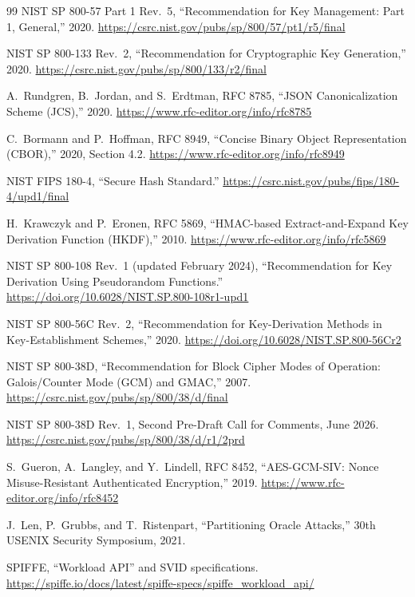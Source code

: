 \documentclass[11pt,letterpaper]{article}
\begin{document}
\begin{thebibliography}{99}
 NIST SP 800-57 Part 1 Rev.~5, ``Recommendation for Key Management: Part 1, General,'' 2020. \url{https://csrc.nist.gov/pubs/sp/800/57/pt1/r5/final}

 NIST SP 800-133 Rev.~2, ``Recommendation for Cryptographic Key Generation,'' 2020. \url{https://csrc.nist.gov/pubs/sp/800/133/r2/final}

 A.~Rundgren, B.~Jordan, and S.~Erdtman, RFC 8785, ``JSON Canonicalization Scheme (JCS),'' 2020. \url{https://www.rfc-editor.org/info/rfc8785}

 C.~Bormann and P.~Hoffman, RFC 8949, ``Concise Binary Object Representation (CBOR),'' 2020, Section 4.2. \url{https://www.rfc-editor.org/info/rfc8949}

 NIST FIPS 180-4, ``Secure Hash Standard.'' \url{https://csrc.nist.gov/pubs/fips/180-4/upd1/final}

 H.~Krawczyk and P.~Eronen, RFC 5869, ``HMAC-based Extract-and-Expand Key Derivation Function (HKDF),'' 2010. \url{https://www.rfc-editor.org/info/rfc5869}

 NIST SP 800-108 Rev.~1 (updated February 2024), ``Recommendation for Key Derivation Using Pseudorandom Functions.'' \url{https://doi.org/10.6028/NIST.SP.800-108r1-upd1}

 NIST SP 800-56C Rev.~2, ``Recommendation for Key-Derivation Methods in Key-Establishment Schemes,'' 2020. \url{https://doi.org/10.6028/NIST.SP.800-56Cr2}

 NIST SP 800-38D, ``Recommendation for Block Cipher Modes of Operation: Galois/Counter Mode (GCM) and GMAC,'' 2007. \url{https://csrc.nist.gov/pubs/sp/800/38/d/final}

 NIST SP 800-38D Rev.~1, Second Pre-Draft Call for Comments, June 2026. \url{https://csrc.nist.gov/pubs/sp/800/38/d/r1/2prd}

 S.~Gueron, A.~Langley, and Y.~Lindell, RFC 8452, ``AES-GCM-SIV: Nonce Misuse-Resistant Authenticated Encryption,'' 2019. \url{https://www.rfc-editor.org/info/rfc8452}

 J.~Len, P.~Grubbs, and T.~Ristenpart, ``Partitioning Oracle Attacks,'' 30th USENIX Security Symposium, 2021.

 SPIFFE, ``Workload API'' and SVID specifications. \url{https://spiffe.io/docs/latest/spiffe-specs/spiffe_workload_api/}


\end{thebibliography}
\end{document}
